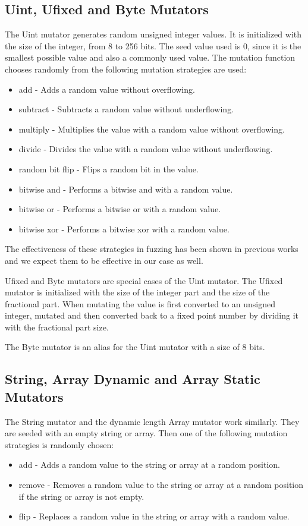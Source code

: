 \subsection*{Uint, Ufixed and Byte Mutators}
The Uint mutator generates random unsigned integer values. It is initialized with the size of the integer, from 8 to 256 bits. The seed value used is 0, since it is the smallest possible value and also a commonly used value. The mutation function chooses randomly from the following mutation strategies are used:
\begin{itemize}
    \item add - Adds a random value without overflowing.
    \item subtract - Subtracts a random value without underflowing.
    \item multiply - Multiplies the value with a random value without overflowing.
    \item divide - Divides the value with a random value without underflowing.
    \item random bit flip - Flips a random bit in the value.
    \item bitwise and - Performs a bitwise and with a random value.
    \item bitwise or - Performs a bitwise or with a random value.
    \item bitwise xor - Performs a bitwise xor with a random value.
\end{itemize}
The effectiveness of these strategies in fuzzing has been shown in previous works and we expect them to be effective in our case as well.

Ufixed and Byte mutators are special cases of the Uint mutator. The Ufixed mutator is initialized with the size of the integer part and the size of the fractional part. When mutating the value is first converted to an unsigned integer, mutated and then converted back to a fixed point number by dividing it with the fractional part size.

The Byte mutator is an alias for the Uint mutator with a size of 8 bits.

\subsection*{String, Array Dynamic and Array Static Mutators}
The String mutator and the dynamic length Array mutator work similarly. They are seeded with an empty string or array. Then one of the following mutation strategies is randomly chosen:
\begin{itemize}
    \item add - Adds a random value to the string or array at a random position.
    \item remove - Removes a random value to the string or array at a random position if the string or array is not empty.
    \item flip - Replaces a random value in the string or array with a random value.
\end{itemize}


